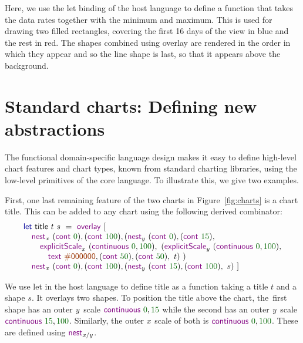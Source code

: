 \documentclass{jfp}
\newcommand{\X}{\emph{x}\ }
\newcommand{\Y}{\emph{y}\ }
\newcommand{\num}[1]{\textcolor{numclr}{#1}}
\newcommand{\strf}[1]{\textnormal{\textcolor{strclr}{\sffamily #1}}}
\newcommand{\ident}[1]{\textnormal{\textcolor{idclr}{\sffamily #1}}}
\newcommand{\kvd}[1]{\textnormal{\textcolor{kvdclr}{\sffamily #1}}}
\newcommand{\fkvd}[1]{\textnormal{\textcolor{fkvdclr}{\sffamily #1}}}
\begin{document}
\noindent
Here, we use the \fkvd{let} binding of the host language to define a function that takes
the data \ident{rates} together with the minimum and maximum. This is used for drawing
two filled rectangles, covering the first 16 days of the view in blue and the rest in red.
The shapes combined using \kvd{overlay} are rendered in the order in which they appear and so
the line shape is last, so that it appears above the background.

\section{Standard charts: Defining new abstractions}
\label{sec:abstractions}

The functional domain-specific language design makes it easy to define high-level chart features
and chart types, known from standard charting libraries, using the low-level primitives of the
core language. To illustrate this, we give two examples.

First, one last remaining feature of the two charts in Figure~\ref{fig:charts} is a chart title.
This can be added to any chart using the following derived combinator:
%
\begin{equation*}
\begin{array}{l}
\fkvd{let}~\ident{title}~t~s~=\kvd{overlay}~[\\
\quad \kvd{nest}_x~(\kvd{cont}~\num{0}), (\kvd{cont}~\num{100}),
  (\kvd{nest}_y~(\kvd{cont}~\num{0}), (\kvd{cont}~\num{15}), \\
\quad\quad \kvd{explicitScale}_x~(\kvd{continuous}~\num{0},\num{100}),~(\kvd{explicitScale}_y~(\kvd{continuous}~\num{0},\num{100}),\\
\quad\qquad \kvd{text}~\strf{\#000000}, (\kvd{cont}~\num{50}), (\kvd{cont}~\num{50}),~t)~)\\
\quad \kvd{nest}_x~(\kvd{cont}~\num{0}), (\kvd{cont}~\num{100}),
  (\kvd{nest}_y~(\kvd{cont}~\num{15}), (\kvd{cont}~\num{100}),~s)~]
\end{array}
\end{equation*}

\vspace{-0.5em}
\noindent
We use \fkvd{let} in the host language to define \ident{title} as a function taking a title $t$ and
a shape $s$. It overlays two shapes. To position the title above the chart, the~first
shape has an outer \Y scale $\kvd{continuous}~\num{0},\num{15}$ while the second has an outer \Y scale
$\kvd{continuous}~\num{15},\num{100}$. Similarly, the outer \X scale of both is $\kvd{continuous}~\num{0},\num{100}$.
These are defined using $\kvd{nest}_{x/y}$.
\end{document}
